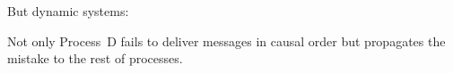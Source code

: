 \documentclass[10pt, xcolor={usenames, dvipsnames}]{beamer}
\newcommand{\xmark}{\ding{55}}
\newcommand{\NO}[1]{\textcolor{red}{#1}}
\begin{document}
\begin{frame}{But dynamic systems: \NO{\xmark}}
  \begin{center}
  \begin{minipage}{0.35\textwidth}
    \begin{center}
      
    \end{center}
  \end{minipage}
  \begin{minipage}{0.35\textwidth}
    \begin{center}
      
    \end{center}
  \end{minipage}
  \end{center}  

  Not only Process~D fails to deliver messages in causal order but propagates the
  mistake to the rest of processes.

\end{frame}


  

\end{document}
